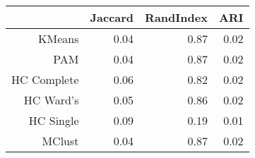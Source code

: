 \begin{table}[ht]
\centering
\begin{tabular}{rrrr}
  \hline
 & Jaccard & RandIndex & ARI \\ 
  \hline
KMeans & 0.04 & 0.87 & 0.02 \\ 
  PAM & 0.04 & 0.87 & 0.02 \\ 
  HC Complete & 0.06 & 0.82 & 0.02 \\ 
  HC Ward's & 0.05 & 0.86 & 0.02 \\ 
  HC Single & 0.09 & 0.19 & 0.01 \\ 
  MClust & 0.04 & 0.87 & 0.02 \\ 
   \hline
\end{tabular}
\end{table}
